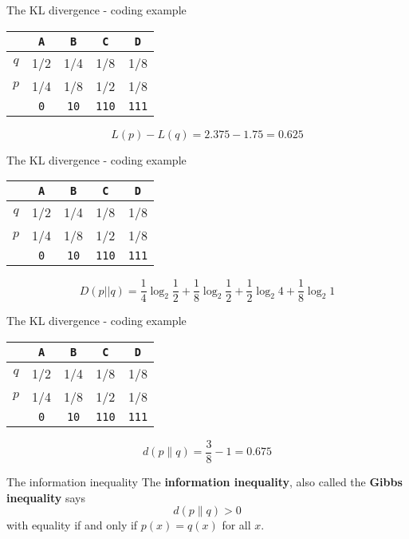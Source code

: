 \documentclass{beamer}
\newcommand{\crish}{\color{reddish}}
\newcommand{\cbla}{\color{black}}
\newcommand{\letter}[1]{\color{blue}\texttt{#1}\color{black}}
\newcommand{\binary}[1]{\color{red}\texttt{#1}\color{black}}
\begin{document}
\begin{frame}{The KL divergence - coding example}
\begin{center}
\begin{tabular}{c|cccc}
&\letter{A}&\letter{B}&\letter{C}&\letter{D}\\
\hline
$q$&1/2&1/4&1/8&1/8\\
$p$&1/4&1/8&1/2&1/8\\
\hline
&\binary{0}&\binary{10}&\binary{110}&\binary{111}
\end{tabular}
\end{center}
\crish
$$
L(p)-L(q)=2.375-1.75=0.625
$$
\cbla
\end{frame}


\begin{frame}{The KL divergence - coding example}
\begin{center}
\begin{tabular}{c|cccc}
&\letter{A}&\letter{B}&\letter{C}&\letter{D}\\
\hline
$q$&1/2&1/4&1/8&1/8\\
$p$&1/4&1/8&1/2&1/8\\
\hline
&\binary{0}&\binary{10}&\binary{110}&\binary{111}
\end{tabular}
\end{center}
\crish
$$
D(p||q)=\frac{1}{4}\log_2{\frac{1}{2}}+\frac{1}{8}\log_2{\frac{1}{2}}+\frac{1}{2}\log_2{4}+\frac{1}{8}\log_2{1}
$$
\cbla
\end{frame}


\begin{frame}{The KL divergence - coding example}
\begin{center}
\begin{tabular}{c|cccc}
&\letter{A}&\letter{B}&\letter{C}&\letter{D}\\
\hline
$q$&1/2&1/4&1/8&1/8\\
$p$&1/4&1/8&1/2&1/8\\
\hline
&\binary{0}&\binary{10}&\binary{110}&\binary{111}
\end{tabular}
\end{center}
\crish
$$
d(p\|q)=\frac{3}{8}-1=0.675
$$
\cbla
\end{frame}


\begin{frame}{The information inequality}
  The \textbf{information inequality}, also called the \textbf{Gibbs inequality} says
  \crish
  $$d(p\|q)>0$$
  \cbla
  with equality if and only if \crish$p(x)=q(x)$\cbla{} for all \crish$x$\cbla{}.
\end{frame}
\end{document}
